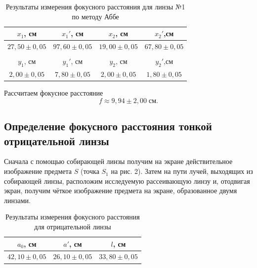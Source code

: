 \documentclass[a4paper]{article}
\begin{document}
\begin{table}[!ht]
    \centering
    \caption{Результаты измерения фокусного расстояния для линзы №1 по методу Аббе}
    \begin{tabular}{cccc}
    \hline
    \multicolumn{1}{|c|}{$x_1$, см}        & \multicolumn{1}{c|}{$x_1'$, см}      & \multicolumn{1}{c|}{$x_2$, см}        & \multicolumn{1}{c|}{$x_2'$,см}        \\ \hline
    \multicolumn{1}{|c|}{$27,50 \pm 0,05$} & \multicolumn{1}{c|}{$97,60\pm 0,05$} & \multicolumn{1}{c|}{$19,00 \pm 0,05$} & \multicolumn{1}{c|}{$67,80 \pm 0,05$} \\ \hline
    \multicolumn{1}{l}{}                   & \multicolumn{1}{l}{}                 & \multicolumn{1}{l}{}                  & \multicolumn{1}{l}{}                  \\ \hline
    \multicolumn{1}{|c|}{$y_1$, см}        & \multicolumn{1}{c|}{$y_1'$, см}      & \multicolumn{1}{c|}{$y_2$, см}        & \multicolumn{1}{c|}{$y_2'$,см}        \\ \hline
    \multicolumn{1}{|c|}{$2,00 \pm 0,05$}  & \multicolumn{1}{c|}{$7,80 \pm 0,05$} & \multicolumn{1}{c|}{$2,00 \pm 0,05$}  & \multicolumn{1}{c|}{$1,80 \pm 0,05$}  \\ \hline
    \end{tabular}
    \end{table}

    \noindent Рассчитаем фокусное расстояние $$f \approx 9,94 \pm 2,00 \;\text{см}.$$

    \subsection{Определение фокусного расстояния тонкой отрицательной линзы}

    Сначала с помощью собирающей линзы получим на экране действительное изображение предмета $S$ (точка $S_1$ на рис. 2). Затем на пути лучей, выходящих из собирающей линзы, расположим исследуемую рассеивающую линзу и, отодвигая экран, получим чёткое изображение предмета на экране, образованное двумя линзами.

    \begin{table}[!ht]
        \centering
        \caption{Результаты измерения фокусного расстояния для отрицательной линзы}
        \begin{tabular}{|c|c|c|}
        \hline
        $a_0$, см        & $a'$, см        & $l$, см          \\ \hline
        $42,10 \pm 0,05$ & $26,10\pm 0,05$ & $33,80 \pm 0,05$ \\ \hline
        \end{tabular}
        \end{table}
\end{document}

